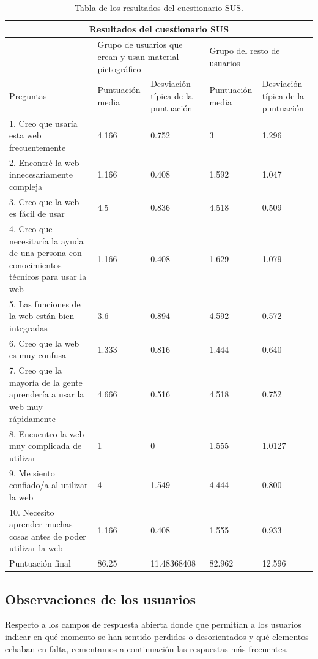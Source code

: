 \begin{table}
	
	\begin{tabular}{ |p{4cm}|p{2cm}|p{2cm}|p{2cm}|p{2cm}|  }
		\hline
		\multicolumn{5}{|c|}{Resultados del cuestionario SUS} \\
		\hline
		& \multicolumn{2}{p{4cm}|}{Grupo de usuarios que crean y usan material pictográfico} & \multicolumn{2}{p{4cm}|}{Grupo del resto de usuarios }  \\ 
		\hline
		Preguntas & Puntuación media  &Desviación típica de la puntuación & Puntuación media & Desviación típica de la puntuación\\
		\hline
		1. Creo que usaría esta web frecuentemente &4.166 &0.752 &3  &1.296\\
		\hline
		2. Encontré la web innecesariamente compleja &1.166  &0.408  &1.592 &1.047\\
		\hline
		3. Creo que la web es fácil de usar &4.5 &0.836 &4.518  &0.509\\
		\hline
		4. Creo que necesitaría la ayuda de una persona con conocimientos técnicos para usar la web &1.166 &0.408 &1.629  &1.079\\
		\hline
		5. Las funciones de la web están bien integradas &3.6 &0.894 &4.592 &0.572\\
		\hline
		6. Creo que la web es muy confusa &1.333  &0.816 &1.444 &0.640\\
		\hline
		7. Creo que la mayoría de la gente aprendería a usar la web muy rápidamente &4.666 &0.516  &4.518 &0.752\\
		\hline
		8. Encuentro la web muy complicada de utilizar &1 &0 &1.555 &1.0127 \\
		\hline
		9. Me siento confiado/a al utilizar la web &4 &1.549 &4.444  &0.800 \\
		\hline
		10. Necesito aprender muchas cosas antes de poder utilizar la web &1.166 &0.408 &1.555  &0.933 \\
		\hline
		Puntuación final &86.25 &11.48368408 &82.962 &12.596 \\
		\hline
	\end{tabular}
\caption{\label{tab:cuestionarioSUS}Tabla de los resultados del cuestionario SUS.}	
\end{table}


\subsection{Observaciones de los usuarios}
Respecto a los campos de respuesta abierta donde que permitían a los usuarios indicar en qué momento se han sentido perdidos o desorientados  y qué elementos echaban en falta, cementamos a continuación las respuestas más frecuentes. 

